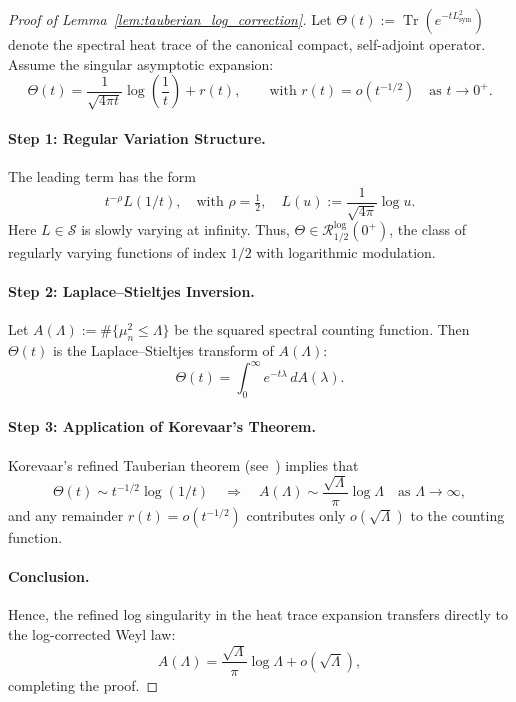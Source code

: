 \begin{proof}[Proof of Lemma~\ref{lem:tauberian_log_correction}]
Let \( \Theta(t) := \operatorname{Tr}(e^{-t L_{\mathrm{sym}}^2}) \) denote the spectral heat trace of the canonical compact, self-adjoint operator. Assume the singular asymptotic expansion:
\[
\Theta(t) = \frac{1}{\sqrt{4\pi t}} \log\left( \frac{1}{t} \right) + r(t), \qquad \text{with } r(t) = o(t^{-1/2}) \quad \text{as } t \to 0^+.
\]

\paragraph{Step 1: Regular Variation Structure.}
The leading term has the form
\[
t^{-\rho} L(1/t), \quad \text{with } \rho = \tfrac{1}{2}, \quad L(u) := \frac{1}{\sqrt{4\pi}} \log u.
\]
Here \( L \in \mathcal{S} \) is slowly varying at infinity. Thus, \( \Theta \in \mathcal{R}_{1/2}^{\log}(0^+) \), the class of regularly varying functions of index \( 1/2 \) with logarithmic modulation.

\paragraph{Step 2: Laplace–Stieltjes Inversion.}
Let \( A(\Lambda) := \#\{ \mu_n^2 \le \Lambda \} \) be the squared spectral counting function. Then \( \Theta(t) \) is the Laplace–Stieltjes transform of \( A(\Lambda) \):
\[
\Theta(t) = \int_0^\infty e^{-t\lambda} \, dA(\lambda).
\]

\paragraph{Step 3: Application of Korevaar’s Theorem.}
Korevaar’s refined Tauberian theorem (see~\cite[Ch.~III, §5, Thm.~5.5]{Korevaar2004Tauberian}) implies that
\[
\Theta(t) \sim t^{-1/2} \log(1/t) \quad \Rightarrow \quad
A(\Lambda) \sim \frac{\sqrt{\Lambda}}{\pi} \log \Lambda \quad \text{as } \Lambda \to \infty,
\]
and any remainder \( r(t) = o(t^{-1/2}) \) contributes only \( o(\sqrt{\Lambda}) \) to the counting function.

\paragraph{Conclusion.}
Hence, the refined log singularity in the heat trace expansion transfers directly to the log-corrected Weyl law:
\[
A(\Lambda) = \frac{\sqrt{\Lambda}}{\pi} \log \Lambda + o(\sqrt{\Lambda}),
\]
completing the proof.
\end{proof}
